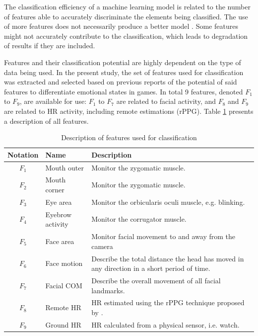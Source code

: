 The classification efficiency of a machine learning model is related to the number of features able to accurately discriminate the elements being classified. The use of more features does not necessarily produce a better model \parencite[Chapter 6]{james2013introduction}. Some features might not accurately contribute to the classification, which leads to degradation of results if they are included.

Features and their classification potential are highly dependent on the type of data being used. In the present study, the set of features used for classification was extracted and selected based on previous reports of the potential of said features to differentiate emotional states in games. In total 9 features, denoted $F_1$ to $F_9$, are available for use: $F_1$ to $F_7$ are related to facial activity, and $F_8$ and $F_9$ are related to HR activity, including remote estimations (rPPG). Table \ref{table:study5-features-list} presents a description of all features.

\begin{table}[h]
    \centering
    \caption{Description of features used for classification}
    \label{table:study5-features-list}
    \begin{tabular}[l]{@{}clp{6.5cm}}
        \toprule%
            \textbf{Notation} & \textbf{Name} & \textbf{Description} \\
        \midrule%
            $F_1$ & Mouth outer & Monitor the zygomatic muscle.  \\
            $F_2$ & Mouth corner & Monitor the zygomatic muscle. \\
            $F_3$ & Eye area & Monitor the orbicularis oculi muscle, e.g. blinking. \\
            $F_4$ & Eyebrow activity & Monitor the corrugator muscle.  \\
            $F_5$ & Face area & Monitor facial movement to and away from the camera  \\
            $F_6$ & Face motion & Describe the total distance the head has moved in any direction in a short period of time.  \\
            $F_7$ & Facial COM & Describe the overall movement of all facial landmarks. \\
            $F_8$ & Remote HR & HR estimated using the rPPG technique proposed by \textcite{poh2011advancements}.  \\
            $F_9$ & Ground HR & HR calculated from a physical sensor, i.e. watch. \\
        \bottomrule%
    \end{tabular}
\end{table}

